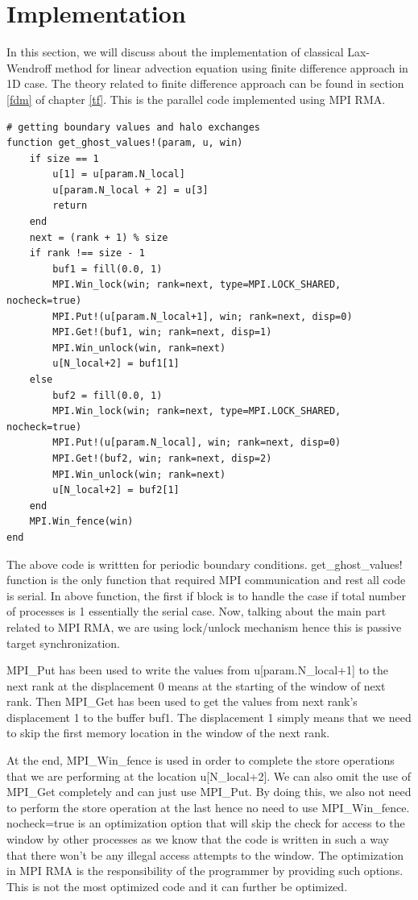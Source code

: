 \section{Implementation} \label{i}
In this section, we will discuss about the implementation of classical Lax-Wendroff method for linear advection equation using finite difference approach in 1D case. The theory related to finite difference approach can be found in section \ref{fdm} of chapter \ref{tf}. This is the parallel code implemented using MPI RMA.
\begin{verbatim}
# getting boundary values and halo exchanges
function get_ghost_values!(param, u, win)
    if size == 1
        u[1] = u[param.N_local]
        u[param.N_local + 2] = u[3]
        return
    end
    next = (rank + 1) % size
    if rank !== size - 1  
        buf1 = fill(0.0, 1)
        MPI.Win_lock(win; rank=next, type=MPI.LOCK_SHARED, nocheck=true)
        MPI.Put!(u[param.N_local+1], win; rank=next, disp=0)
        MPI.Get!(buf1, win; rank=next, disp=1)
        MPI.Win_unlock(win, rank=next)
        u[N_local+2] = buf1[1]
    else
        buf2 = fill(0.0, 1)
        MPI.Win_lock(win; rank=next, type=MPI.LOCK_SHARED, nocheck=true)
        MPI.Put!(u[param.N_local], win; rank=next, disp=0)
        MPI.Get!(buf2, win; rank=next, disp=2)
        MPI.Win_unlock(win; rank=next)
        u[N_local+2] = buf2[1]
    end
    MPI.Win_fence(win)
end
\end{verbatim}
The above code is writtten for periodic boundary conditions. {\ttfamily get\_ghost\_values!} function is the only function that required MPI communication and rest all code is serial. In above function, the first {\ttfamily if} block is to handle the case if total number of processes is 1 essentially the serial case. Now, talking about the main part related to MPI RMA, we are using {\ttfamily lock/unlock} mechanism hence this is passive target synchronization.

{\ttfamily MPI\_Put} has been used to write the values from {\ttfamily u[param.N\_local+1]} to the {\ttfamily next} rank at the displacement 0 means at the starting of the window of {\ttfamily next} rank. Then {\ttfamily MPI\_Get} has been used to get the values from {\ttfamily next} rank's displacement 1 to the buffer {\ttfamily buf1}. The displacement 1 simply means that we need to skip the first memory location in the window of the {\ttfamily next} rank. 

At the end, {\ttfamily MPI\_Win\_fence} is used in order to complete the store operations that we are performing at the location {\ttfamily u[N\_local+2]}. We can also omit the use of {\ttfamily MPI\_Get} completely and can just use {\ttfamily MPI\_Put}. By doing this, we also not need to perform the store operation at the last hence no need to use {\ttfamily MPI\_Win\_fence}. {\ttfamily nocheck=true} is an optimization option that will skip the check for access to the window by other processes as we know that the code is written in such a way that there won't be any illegal access attempts to the window. The optimization in MPI RMA is the responsibility of the programmer by providing such options. This is not the most optimized code and it can further be optimized. 

